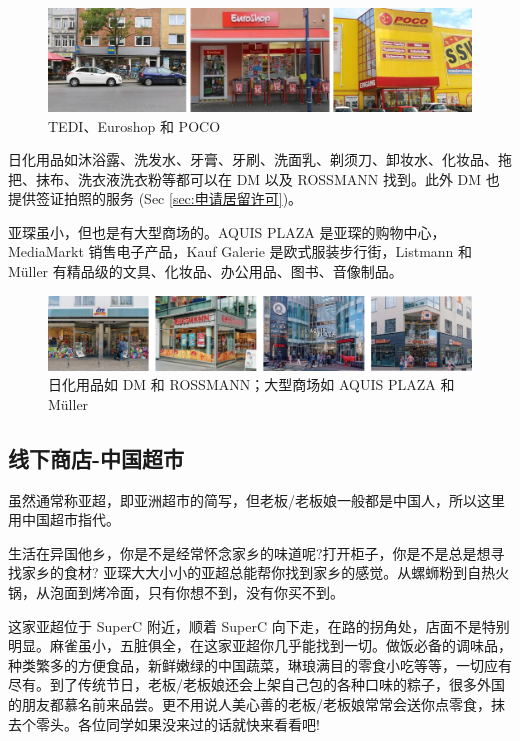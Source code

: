     \begin{figure}[ht]
      \centering
      \includegraphics[width=.8\textwidth]{在亚琛学习和生活/日常消费和饮食/德国超市/TEDI、Euroshop 和 POCO.png}
      \caption{TEDI、Euroshop 和 POCO}
      \label{fig:TEDI、Euroshop 和 POCO}
    \end{figure}

    日化用品如沐浴露、洗发水、牙膏、牙刷、洗面乳、剃须刀、卸妆水、化妆品、拖把、抹布、洗衣液洗衣粉等都可以在 DM 以及 ROSSMANN 找到。此外 DM 也提供签证拍照的服务 (Sec \ref{sec:申请居留许可})。

    亚琛虽小，但也是有大型商场的。AQUIS PLAZA 是亚琛的购物中心，MediaMarkt 销售电子产品，Kauf Galerie 是欧式服装步行街，Listmann 和 Müller 有精品级的文具、化妆品、办公用品、图书、音像制品。

    \begin{figure}[ht]
      \centering
      \includegraphics[width=\textwidth]{在亚琛学习和生活/日常消费和饮食/德国超市/日化用品如 DM 和 ROSSMANN；大型商场如 AQUIS PLAZA 和 Müller.png}
      \caption{日化用品如 DM 和 ROSSMANN；大型商场如 AQUIS PLAZA 和 Müller}
      \label{fig:日化用品如 DM 和 ROSSMANN；大型商场如 AQUIS PLAZA 和 Müller}
    \end{figure}

  \subsection{线下商店-中国超市}\label{subsec:线下商店-中国超市}

    虽然通常称亚超，即亚洲超市的简写，但老板/老板娘一般都是中国人，所以这里用中国超市指代。

    生活在异国他乡，你是不是经常怀念家乡的味道呢?打开柜子，你是不是总是想寻找家乡的食材? 亚琛大大小小的亚超总能帮你找到家乡的感觉。从螺蛳粉到自热火锅，从泡面到烤冷面，只有你想不到，没有你买不到。

    \href{http://www.sinostore.de/}{} 这家亚超位于 SuperC 附近，顺着 SuperC 向下走，在路的拐角处，店面不是特别明显。麻雀虽小，五脏俱全，在这家亚超你几乎能找到一切。做饭必备的调味品，种类繁多的方便食品，新鲜嫩绿的中国蔬菜，琳琅满目的零食小吃等等，一切应有尽有。到了传统节日，老板/老板娘还会上架自己包的各种口味的粽子，很多外国的朋友都慕名前来品尝。更不用说人美心善的老板/老板娘常常会送你点零食，抹去个零头。各位同学如果没来过的话就快来看看吧!

